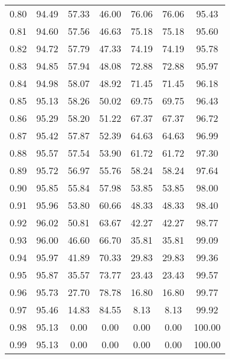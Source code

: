 \begin{tabular}{|c|c|c|c|c|c|c|}
      0.80 &     94.49 &     57.33 &      46.00 &   76.06 &      76.06 &         95.43 \\
      0.81 &     94.60 &     57.56 &      46.63 &   75.18 &      75.18 &         95.60 \\
      0.82 &     94.72 &     57.79 &      47.33 &   74.19 &      74.19 &         95.78 \\
      0.83 &     94.85 &     57.94 &      48.08 &   72.88 &      72.88 &         95.97 \\
      0.84 &     94.98 &     58.07 &      48.92 &   71.45 &      71.45 &         96.18 \\
      0.85 &     95.13 &     58.26 &      50.02 &   69.75 &      69.75 &         96.43 \\
      0.86 &     95.29 &     58.20 &      51.22 &   67.37 &      67.37 &         96.72 \\
      0.87 &     95.42 &     57.87 &      52.39 &   64.63 &      64.63 &         96.99 \\
      0.88 &     95.57 &     57.54 &      53.90 &   61.72 &      61.72 &         97.30 \\
      0.89 &     95.72 &     56.97 &      55.76 &   58.24 &      58.24 &         97.64 \\
      0.90 &     95.85 &     55.84 &      57.98 &   53.85 &      53.85 &         98.00 \\
      0.91 &     95.96 &     53.80 &      60.66 &   48.33 &      48.33 &         98.40 \\
      0.92 &     96.02 &     50.81 &      63.67 &   42.27 &      42.27 &         98.77 \\
      0.93 &     96.00 &     46.60 &      66.70 &   35.81 &      35.81 &         99.09 \\
      0.94 &     95.97 &     41.89 &      70.33 &   29.83 &      29.83 &         99.36 \\
      0.95 &     95.87 &     35.57 &      73.77 &   23.43 &      23.43 &         99.57 \\
      0.96 &     95.73 &     27.70 &      78.78 &   16.80 &      16.80 &         99.77 \\
      0.97 &     95.46 &     14.83 &      84.55 &    8.13 &       8.13 &         99.92 \\
      0.98 &     95.13 &      0.00 &       0.00 &    0.00 &       0.00 &        100.00 \\
      0.99 &     95.13 &      0.00 &       0.00 &    0.00 &       0.00 &        100.00 \\
\bottomrule
\end{tabular}
